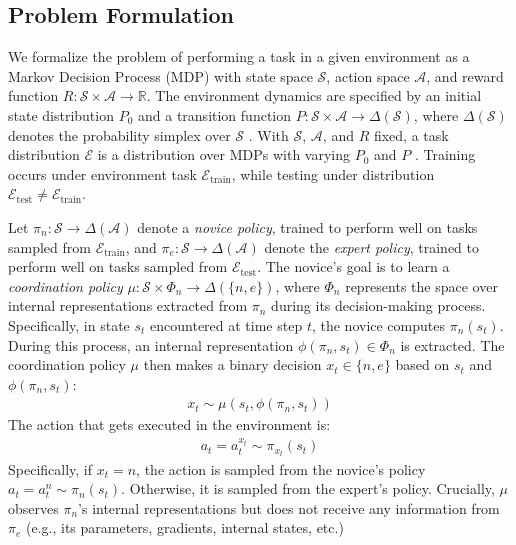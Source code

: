 \subsection{Problem Formulation}


We formalize the problem of performing a task in a given environment as a Markov Decision Process (MDP) with state space $\mathcal{S}$, action space $\mathcal{A}$, and reward function $R: \mathcal{S} \times \mathcal{A} \rightarrow \mathbb{R}$. The environment dynamics are specified by an initial state distribution $P_0$ and a transition function $P: \mathcal{S} \times \mathcal{A} \rightarrow \Delta(\mathcal{S})$, where $\Delta(\mathcal{S})$ denotes the probability simplex over  $\mathcal{S}$ \citep{sutton2018reinforcement}. 
With $\mathcal{S}$, $\mathcal{A}$, and $R$ fixed, a task distribution $\mathcal{E}$ is a distribution over MDPs with varying $P_0$ and $P$ \citep{hallak2015contextual, langford2017contextual}. 
Training occurs under environment task $\mathcal{E}_{\text{train}}$, while testing under distribution $\mathcal{E}_{\text{test}} \neq \mathcal{E}_{\text{train}}$.


Let $\pi_n: \mathcal{S} \rightarrow \Delta(\mathcal{A})$ denote a \textit{novice policy}, trained to perform well on tasks sampled from $\mathcal{E}_{\text{train}}$, and $\pi_e: \mathcal{S} \rightarrow \Delta(\mathcal{A})$ denote the \textit{expert policy}, trained to perform well on tasks sampled from $\mathcal{E}_{\text{test}}$. The novice's goal is to learn a \textit{coordination policy} $\mu: \mathcal{S} \times \Phi_n \rightarrow \Delta(\{n, e\})$, where $\Phi_n$ represents the space over internal representations extracted from $\pi_n$ during its decision-making process. Specifically, in state $s_t$ encountered at time step $t$, the novice computes $\pi_n(s_t)$.
During this process, an internal representation $\phi(\pi_n, s_t) \in \Phi_n$ is extracted.
The coordination policy $\mu$ then makes a binary decision $x_t \in \{ n, e \}$ based on $s_t$ and $\phi(\pi_n, s_t)$:
\begin{align}
    x_t \sim \mu(s_t, \phi(\pi_n, s_t))
\end{align}
The action that gets executed in the environment is:
\begin{align}
    a_t = a^{x_t}_t \sim \pi_{x_t}(s_t)
\end{align} Specifically, if $x_t = n$, the action is sampled from the novice's policy $a_t = a^n_t \sim \pi_n(s_t)$. Otherwise, it is sampled from the expert's policy.
Crucially, $\mu$ observes $\pi_n$'s internal representations but does not receive any information from $\pi_e$ (e.g., its parameters, gradients, internal states, etc.)

